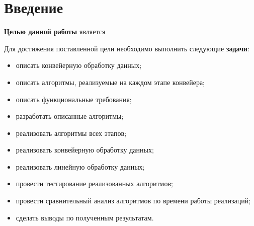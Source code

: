 \chapter*{Введение}


\textbf{Целью данной работы} является

Для достижения поставленной цели необходимо выполнить следующие
\textbf{задачи}:
\begin{itemize}[left=\parindent]
    \item описать конвейерную обработку данных;
    \item описать алгоритмы, реализуемые на каждом этапе конвейера;
    \item описать функциональные требования;
    \item разработать описанные алгоритмы;
    \item реализовать алгоритмы всех этапов;
    \item реализовать конвейерную обработку данных;
    \item реализовать линейную обработку данных;
    \item провести тестирование реализованных алгоритмов;
    \item провести сравнительный анализ алгоритмов по времени работы
          реализаций;
    \item сделать выводы по полученным результатам.
\end{itemize}
